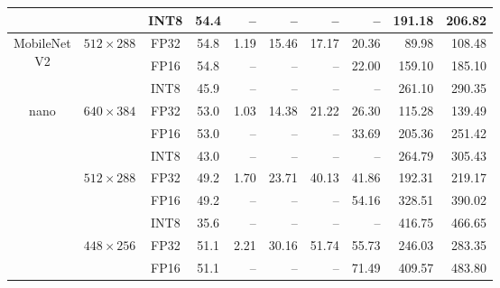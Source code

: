 \begin{appendices}
\begin{table}
\begin{threeparttable}
\begin{tabular}{|c|c|c|c|rrrrrr|}
                                                                    &                                   & INT8 & 54.4 &    -- &     -- &     -- &     -- &  191.18 &  206.82 \\
            \hline
            \multirow{3}{*}{\parbox{1.6cm}{\centering MobileNet\\V2}} & \multirow{3}{*}{$512 \times 288$} & FP32 & 54.8 &  1.19 &  15.46 &  17.17 &  20.36 &   89.98 &  108.48 \\
                                                                    &                                   & FP16 & 54.8 &    -- &     -- &     -- &  22.00 &  159.10 &  185.10 \\
                                                                    &                                   & INT8 & 45.9 &    -- &     -- &     -- &     -- &  261.10 &  290.35 \\
            \hline
            \multirow{9}{*}{nano}                                     & \multirow{3}{*}{$640 \times 384$} & FP32 & 53.0 &  1.03 &  14.38 &  21.22 &  26.30 &  115.28 &  139.49 \\
                                                                    &                                   & FP16 & 53.0 &    -- &     -- &     -- &  33.69 &  205.36 &  251.42 \\
                                                                    &                                   & INT8 & 43.0 &    -- &     -- &     -- &     -- &  264.79 &  305.43 \\
            \cline{2-10}
                                                                    & \multirow{3}{*}{$512 \times 288$} & FP32 & 49.2 &  1.70 &  23.71 &  40.13 &  41.86 &  192.31 &  219.17 \\
                                                                    &                                   & FP16 & 49.2 &    -- &     -- &     -- &  54.16 &  328.51 &  390.02 \\
                                                                    &                                   & INT8 & 35.6 &    -- &     -- &     -- &     -- &  416.75 &  466.65 \\
            \cline{2-10}
                                                                    & \multirow{3}{*}{$448 \times 256$} & FP32 & 51.1 &  2.21 &  30.16 &  51.74 &  55.73 &  246.03 &  283.35 \\
                                                                    &                                   & FP16 & 51.1 &    -- &     -- &     -- &  71.49 &  409.57 &  483.80 \\

\end{tabular}
\end{threeparttable}
\end{table}
\end{appendices}
